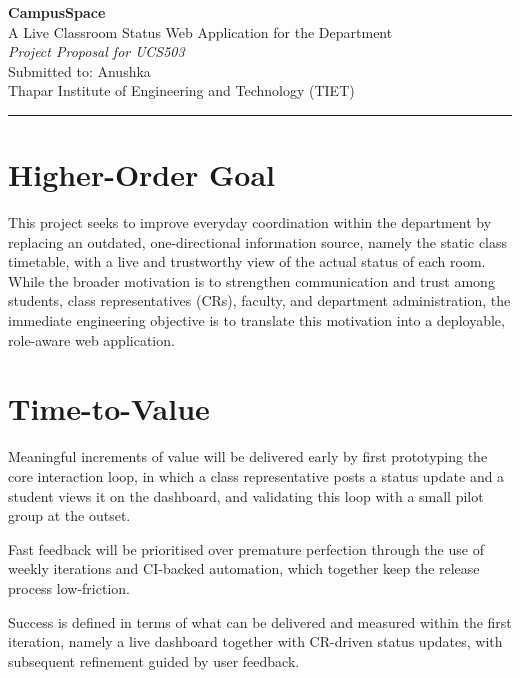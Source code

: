 \documentclass[11pt]{article}
\begin{document}
\begin{center}
    {\Huge \bfseries CampusSpace}\\[0.4em]
    {\Large A Live Classroom Status Web Application for the Department}\\[0.3em]
    {\large \textit{Project Proposal for UCS503}}\\[0.3em]
    {\large Submitted to: Anushka}\\[0.2em]
    {\large Thapar Institute of Engineering and Technology (TIET)}
\end{center}

\vspace{0.3em}
\noindent\rule{\textwidth}{0.6pt}
\vspace{0.5em}

\section{Higher-Order Goal}

\justifying
This project seeks to improve everyday coordination within the department by replacing an outdated, one-directional information source, namely the static class timetable, with a live and trustworthy view of the actual status of each room. While the broader motivation is to strengthen communication and trust among students, class representatives (CRs), faculty, and department administration, the immediate engineering objective is to translate this motivation into a deployable, role-aware web application.

\section{Time-to-Value}

Meaningful increments of value will be delivered early by first prototyping the core interaction loop, in which a class representative posts a status update and a student views it on the dashboard, and validating this loop with a small pilot group at the outset.

Fast feedback will be prioritised over premature perfection through the use of weekly iterations and CI-backed automation, which together keep the release process low-friction.

Success is defined in terms of what can be delivered and measured within the first iteration, namely a live dashboard together with CR-driven status updates, with subsequent refinement guided by user feedback.
\end{document}
